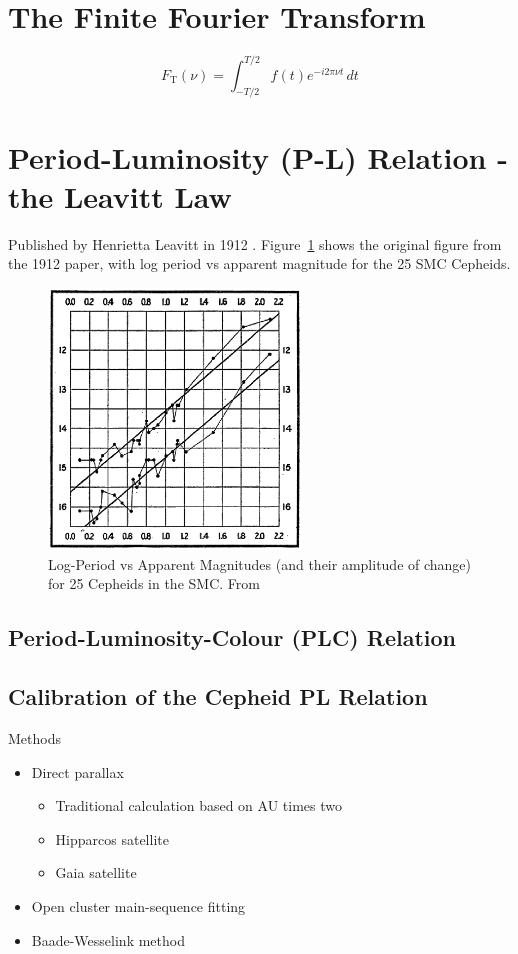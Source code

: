 \documentclass{spy}
\begin{document}
\section{The Finite Fourier Transform}
\begin{equation}
F_\mathrm{T}(\nu) = \int_{-T/2}^{T/2} f(t)e^{-i 2\pi \nu t} \,dt
\end{equation}

\section{Period-Luminosity (P-L) Relation - the Leavitt Law}

Published by Henrietta Leavitt in 1912 \citep{leavittPeriods25Variable1912}. Figure~\ref{leavitt_period_luminosity_diagram} shows the original figure from the 1912 paper, with log period vs apparent magnitude for the 25 SMC Cepheids.

\begin{figure}[ht]
    \centering
    \includegraphics[width=0.6\textwidth]{leavitt_period_luminosity.eps}
    \caption{Log-Period vs Apparent Magnitudes (and their amplitude of change) for 25 Cepheids in the SMC. From \citet{leavittPeriods25Variable1912}}    \label{leavitt_period_luminosity_diagram}
\end{figure}

\subsection{Period-Luminosity-Colour (PLC) Relation}

\subsection{Calibration of the Cepheid PL Relation}
Methods
\begin{itemize}
    \item Direct parallax
        \begin{itemize}
        \item Traditional calculation based on AU times two
        \item Hipparcos satellite
        \item Gaia satellite
        \end{itemize}
    \item Open cluster main-sequence fitting
    \item Baade-Wesselink method
\end{itemize}
\end{document}
